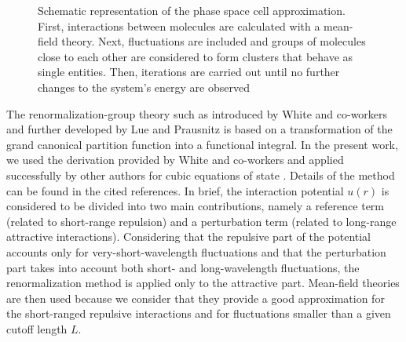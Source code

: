 \documentclass[preprint,12pt,3p]{elsarticle}
\begin{document}
\begin{figure}[!ht]
\centering
\captionsetup{justification=centering}
\caption{Schematic representation of the phase space cell approximation. First, interactions between molecules are calculated with a mean-field theory. Next, fluctuations are included and groups of molecules close to each other are considered to form clusters that behave as single entities. Then, iterations are carried out until no further changes to the system's energy are observed}
\label{fig:schematics}
\end{figure}

The renormalization-group theory such as introduced by White and co-workers \cite{white1993renormalization,white1995renormalization,white1998renormalization} and further developed by Lue and Prausnitz \cite{lue1998renormalization, lue1998brenormalization} is based on a transformation of the grand canonical partition function into a functional integral.
In the present work, we used the derivation provided by White and co-workers \cite{white1993renormalization,white1995renormalization,white1998renormalization} and applied successfully by other authors for cubic equations of state \cite{cai2006vapor,pcm2017application,xu2010crossover,xu2011prediction}. Details of the method can be found in the cited references.
In brief, the interaction potential $u(r)$ is considered to be divided into two main contributions, namely a reference term (related to short-range repulsion) and a perturbation term (related to long-range attractive interactions).
Considering that the repulsive part of the potential accounts only for very-short-wavelength fluctuations and that the perturbation part takes into account both short- and long-wavelength fluctuations, the renormalization method is applied only to the attractive part.
Mean-field theories are then used because we consider that they provide a good approximation for the short-ranged repulsive interactions and for fluctuations smaller than a given cutoff length $L$.
\end{document}
